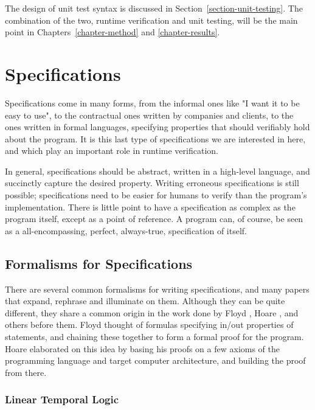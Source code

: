 \documentclass[a4paper,11pt]{kth-mag}
\begin{document}
The design of unit test syntax is discussed in Section~\ref{section-unit-testing}. The combination of the two, runtime verification
and unit testing, will be the main point in Chapters~\ref{chapter-method} and
\ref{chapter-results}.


\section{Specifications} \label{section-specifications}

Specifications come in many forms, from the informal ones like "I want it to be
easy to use", to the contractual ones written by companies and clients, to the
ones written in formal languages, specifying properties that should verifiably
hold about the program. It is this last type of specifications we are
interested in here, and which play an important role in runtime verification.

In general, specifications should be abstract, written in a high-level
language, and succinctly capture the desired property. Writing erroneous
specifications is still possible; specifications need to be easier for humans
to verify than the program's implementation. There is little point to have a
specification as complex as the program itself, except as a point of reference.
A program can, of course, be seen as a all-encompassing, perfect, always-true,
specification of itself.



\subsection{Formalisms for Specifications}

There are several common formalisms for writing specifications, and many papers
that expand, rephrase and illuminate on them. Although they can be quite
different, they share a common origin in the work done by Floyd \cite{floyd67},
Hoare \cite{hoare69}, and others before them.  Floyd thought of formulas
specifying in/out properties of statements, and chaining these together to form
a formal proof for the program. Hoare elaborated on this idea by basing his
proofs on a few axioms of the programming language and target computer
architecture, and building the proof from there.

\subsubsection{Linear Temporal Logic}
\end{document}
